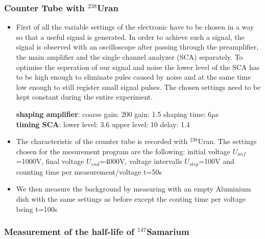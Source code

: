 \documentclass[12pt]{article}
\begin{document}
\subsubsection{Counter Tube with ${}^{238}$Uran}
\begin{itemize}
	\item First of all the variable settings of the electronic have to be chosen in a way so that a useful signal is generated. In order to achieve such a signal, the signal is observed with an oscilloscope after passing through the preamplifier, the main amplifier and the single channel analyzer (SCA) separately. To optimise the seperation of our signal and noise the lower level of the SCA has to be high enough to eliminate pules caused by noise and at the same time low enough to still register small signal pulses. The chosen settings need to be kept constant during the entire experiment.
	
		\textbf{shaping amplifier}: coarse gain: 200 \hspace{1.5cm} gain: 1.5 \hspace{1cm} shaping time: 6$\mu$s\\
		\textbf{timing SCA}: \hspace{1cm} lower level: 3.6 \hspace{0.5cm} upper level: 10 \hspace{2.5cm} delay: 1.4
	
	\item The characteristic of the counter tube is recorded with ${}^{238}$Uran. The settings chosen for the mesurement program are the following: initial voltage $U_{anf}$=1000V, final voltage $U_{end}$=4000V, voltage intervalls $U_{step}$=100V and counting time per measurement/voltage t=50s
	
	\item We then measure the background by measuring with an empty Aluminium dish with the same settings as before except the couting time per voltage being t=100s
\end{itemize}



\subsubsection{Measurement of the half-life of ${}^{147}$Samarium}
\end{document}
